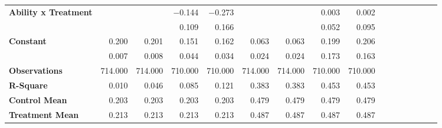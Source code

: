 \begin{tabular}{@{\extracolsep{5pt}}lrrrrrrrrrrrrrrr}
{\bf Ability x Treatment} & \phantom{***} & \phantom{***} & $-$0.144\phantom{\phantom{)}***} & $-$0.273\phantom{\phantom{)}***} & \phantom{***} & \phantom{***} & 0.003\phantom{\phantom{)}***} & 0.002\phantom{\phantom{)}***} \\
{\bf } & \phantom{***} & \phantom{***} & 0.109\phantom{\phantom{)}***} & 0.166\phantom{\phantom{)}***} & \phantom{***} & \phantom{***} & 0.052\phantom{\phantom{)}***} & 0.095\phantom{\phantom{)}***} \\
{\bf Constant} & 0.200\phantom{\phantom{)}***} & 0.201\phantom{\phantom{)}***} & 0.151\phantom{\phantom{)}***} & 0.162\phantom{\phantom{)}***} & 0.063\phantom{\phantom{)}***} & 0.063\phantom{\phantom{)}***} & 0.199\phantom{\phantom{)}***} & 0.206\phantom{\phantom{)}***} \\
{\bf } & 0.007\phantom{\phantom{)}***} & 0.008\phantom{\phantom{)}***} & 0.044\phantom{\phantom{)}***} & 0.034\phantom{\phantom{)}***} & 0.024\phantom{\phantom{)}***} & 0.024\phantom{\phantom{)}***} & 0.173\phantom{\phantom{)}***} & 0.163\phantom{\phantom{)}***} \\
{\bf Observations} & 714.000\phantom{\phantom{)}***} & 714.000\phantom{\phantom{)}***} & 710.000\phantom{\phantom{)}***} & 710.000\phantom{\phantom{)}***} & 714.000\phantom{\phantom{)}***} & 714.000\phantom{\phantom{)}***} & 710.000\phantom{\phantom{)}***} & 710.000\phantom{\phantom{)}***} \\
{\bf R-Square} & 0.010\phantom{***} & 0.046\phantom{***} & 0.085\phantom{***} & 0.121\phantom{***} & 0.383\phantom{***} & 0.383\phantom{***} & 0.453\phantom{***} & 0.453\phantom{***} \\
{\bf Control Mean} & 0.203\phantom{***} & 0.203\phantom{***} & 0.203\phantom{***} & 0.203\phantom{***} & 0.479\phantom{***} & 0.479\phantom{***} & 0.479\phantom{***} & 0.479\phantom{***} \\
{\bf Treatment Mean} & 0.213\phantom{***} & 0.213\phantom{***} & 0.213\phantom{***} & 0.213\phantom{***} & 0.487\phantom{***} & 0.487\phantom{***} & 0.487\phantom{***} & 0.487\phantom{***} \\
\hline
\end{tabular}
